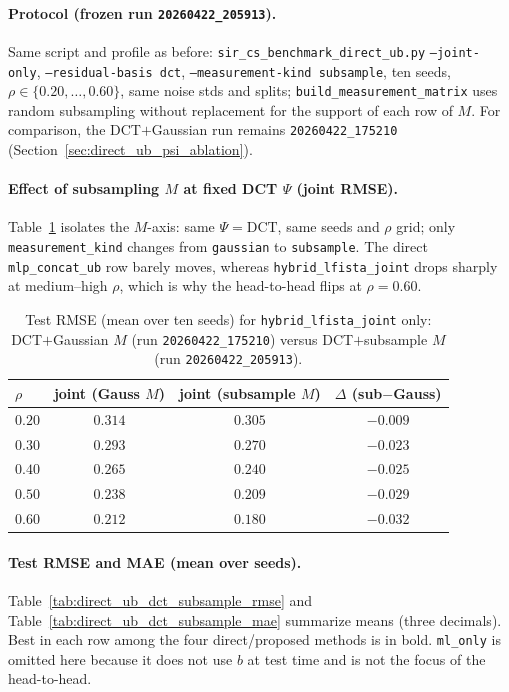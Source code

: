 \paragraph{Protocol (frozen run \texttt{20260422\_205913}).}
Same script and profile as before: \texttt{sir\_cs\_benchmark\_direct\_ub.py} \texttt{--joint-only}, \texttt{--residual-basis dct}, \texttt{--measurement-kind subsample}, ten seeds, $\rho\in\{0.20,\ldots,0.60\}$, same noise stds and splits; \texttt{build\_measurement\_matrix} uses random subsampling without replacement for the support of each row of $M$.
For comparison, the DCT$+$Gaussian run remains \texttt{20260422\_175210} (Section~\ref{sec:direct_ub_psi_ablation}).

\paragraph{Effect of subsampling $M$ at fixed DCT $\Psi$ (joint RMSE).}
Table~\ref{tab:joint_rmse_dct_gauss_vs_sub} isolates the $M$-axis: same $\Psi=\mathrm{DCT}$, same seeds and $\rho$ grid; only \texttt{measurement\_kind} changes from \texttt{gaussian} to \texttt{subsample}. The direct \texttt{mlp\_concat\_ub} row barely moves, whereas \texttt{hybrid\_lfista\_joint} drops sharply at medium--high $\rho$, which is why the head-to-head flips at $\rho=0.60$.

\begin{table}[t]
  \centering
  \caption{Test RMSE (mean over ten seeds) for \texttt{hybrid\_lfista\_joint} only: DCT$+$Gaussian $M$ (run \texttt{20260422\_175210}) versus DCT$+$subsample $M$ (run \texttt{20260422\_205913}).}
  \label{tab:joint_rmse_dct_gauss_vs_sub}
  \small
  \begin{tabular}{@{}lccc@{}}
    \toprule
    $\rho$ & joint (Gauss $M$) & joint (subsample $M$) & $\Delta$ (sub$-$Gauss) \\
    \midrule
    $0.20$ & $0.314$ & $0.305$ & $-0.009$ \\
    $0.30$ & $0.293$ & $0.270$ & $-0.023$ \\
    $0.40$ & $0.265$ & $0.240$ & $-0.025$ \\
    $0.50$ & $0.238$ & $0.209$ & $-0.029$ \\
    $0.60$ & $0.212$ & $0.180$ & $-0.032$ \\
    \bottomrule
  \end{tabular}
\end{table}

\paragraph{Test RMSE and MAE (mean over seeds).}
Table~\ref{tab:direct_ub_dct_subsample_rmse} and Table~\ref{tab:direct_ub_dct_subsample_mae} summarize means (three decimals). Best in each row among the four direct/proposed methods is in bold. \texttt{ml\_only} is omitted here because it does not use $b$ at test time and is not the focus of the head-to-head.

